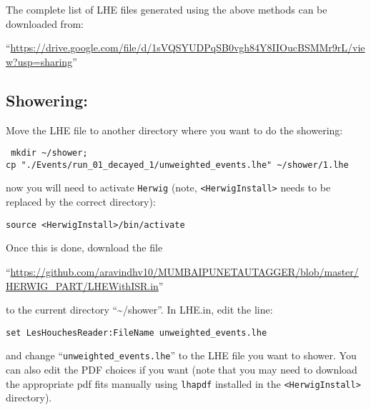 The complete list of LHE files generated using the above methods can be downloaded from:
\begin{flushleft}
    ``\small{\url{https://drive.google.com/file/d/1sVQSYUDPqSB0vgh84Y8IIOucBSMMr9rL/view?usp=sharing}}''
\end{flushleft}

\subsection{Showering:}
Move the LHE file to another directory where you want to do the showering:
\begin{center}
    \begin{minipage}{0.8\textwidth}
        {\tt
            mkdir  \textasciitilde/shower;\\
            cp "./Events/run\_01\_decayed\_1/unweighted\_events.lhe" \textasciitilde/shower/1.lhe
        }
    \end{minipage}
\end{center}
now you will need to activate {\tt Herwig} (note, {\tt <HerwigInstall>} needs to be replaced by the correct directory):
\begin{center}
    \begin{minipage}{0.7\textwidth}
        {\tt source <HerwigInstall>/bin/activate}
    \end{minipage}
\end{center}

Once this is done, download the file
\begin{flushleft}
    ``\small{\url{https://github.com/aravindhv10/MUMBAIPUNETAUTAGGER/blob/master/HERWIG_PART/LHEWithISR.in}}''
\end{flushleft}
to the current directory ``\textasciitilde/shower''. In LHE.in, edit the line:
\begin{center}
    \begin{minipage}{0.7\textwidth}
        {\tt set LesHouchesReader:FileName unweighted\_events.lhe}
    \end{minipage}
\end{center}
and change ``{\tt unweighted\_events.lhe}'' to the LHE file you want to shower.
You can also edit the PDF choices if you want (note that you may need to download the appropriate pdf fits manually using {\tt lhapdf} installed in the {\tt <HerwigInstall>} directory).

